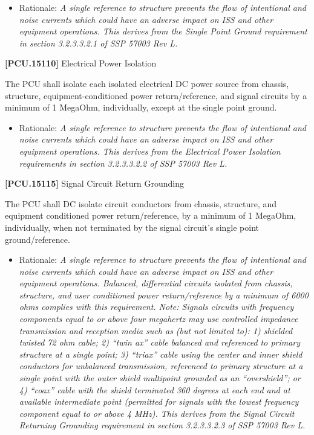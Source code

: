 \documentclass[12pt,oneside,oldfontcommands]{memoir}
\begin{document}
\begin{itemize}
\item{} Rationale: \emph{A single reference to structure prevents the flow of intentional and noise currents which could have an adverse impact on ISS and other equipment operations. This derives from the Single Point Ground requirement in section 3.2.3.3.2.1 of SSP 57003 Rev L.}

\end{itemize}

\textbf{[PCU.15110]} Electrical Power Isolation

The \gls{PCU} shall isolate each isolated electrical DC power source from chassis, structure, equipment-conditioned power return\slash reference, and signal circuits by a minimum of 1 MegaOhm, individually, except at the single point ground.

\begin{itemize}
\item{} Rationale: \emph{A single reference to structure prevents the flow of intentional and noise currents which could have an adverse impact on ISS and other equipment operations. This derives from the Electrical Power Isolation requirements in section 3.2.3.3.2.2 of SSP 57003 Rev L.}

\end{itemize}

\textbf{[PCU.15115]} Signal Circuit Return Grounding

The \gls{PCU} shall DC isolate circuit conductors from chassis, structure, and equipment conditioned power return\slash reference, by a minimum of 1 MegaOhm, individually, when not terminated by the signal circuit's single point ground\slash reference.

\begin{itemize}
\item{} Rationale: \emph{A single reference to structure prevents the flow of intentional and noise currents which could have an adverse impact on ISS and other equipment operations. Balanced, differential circuits isolated from chassis, structure, and user conditioned power return\slash reference by a minimum of 6000 ohms complies with this requirement. Note: Signals circuits with frequency components equal to or above four megahertz may use controlled impedance transmission and reception media such as (but not limited to): 1) shielded twisted 72 ohm cable; 2) ``twin ax'' cable balanced and referenced to primary structure at a single point; 3) ``triax'' cable using the center and inner shield conductors for unbalanced transmission, referenced to primary structure at a single point with the outer shield multipoint grounded as an ``overshield''; or 4) ``coax'' cable with the shield terminated 360 degrees at each end and at available intermediate point (permitted for signals with the lowest frequency component equal to or above 4 MHz). This derives from the Signal Circuit Returning Grounding requirement in section 3.2.3.3.2.3 of SSP 57003 Rev L.}

\end{itemize}
\end{document}
